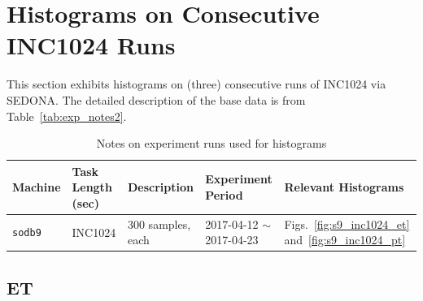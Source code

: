 \clearpage

\section{Histograms on Consecutive INC1024 Runs~\label{sec:s9_1024_runs}} 
This section exhibits histograms on (three) consecutive runs of INC1024 via SEDONA. 
The detailed description of the base data is from Table~\ref{tab:exp_notes2}.

\begin{table}[h]
\begin{center}
\begin{tabular}{|p{2cm}|p{3cm}|p{3cm}|p{4cm}|p{3.5cm}|} \hline
Machine & Task Length (sec) & Description & Experiment Period & Relevant \linebreak Histograms\\ \hline
{\tt sodb9} &  INC1024 & 300 samples, each & 2017-04-12 $\sim$ 2017-04-23 & 
Figs.~\ref{fig:s9_inc1024_et} and~\ref{fig:s9_inc1024_pt}\\ \hline
\end{tabular}
\end{center}
\vspace{-.2in}
\caption{Notes on experiment runs used for histograms\label{tab:inc1024_run_notes}}
\end{table}

\clearpage
\newpage

\subsection{ET}

